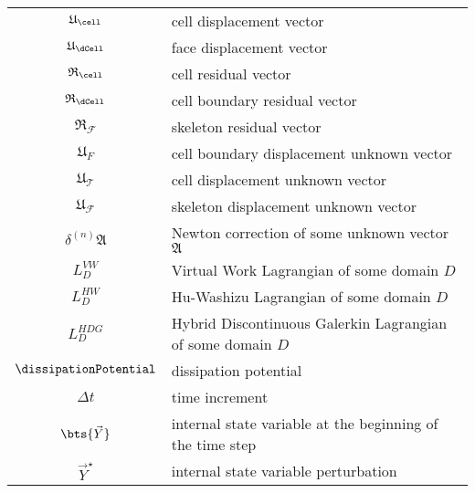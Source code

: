 \begin{longtable}{c l}
    $\mathfrak{U}{}_{\cell}$ & cell displacement vector
    \\
    $\mathfrak{U}{}_{\dCell}$ & face displacement vector
    \\
    $\mathfrak{R}{}_{\cell}$ & cell residual vector
    \\
    $\mathfrak{R}{}_{\dCell}$ & cell boundary residual vector
    \\
    $\mathfrak{R}{}_{\mathcal{F}}$ & skeleton residual vector
    \\
    $\mathfrak{U}{}_{F}$ & cell boundary displacement unknown vector
    \\
    $\mathfrak{U}{}_{\mathcal{T}}$ & cell displacement unknown vector
    \\
    $\mathfrak{U}{}_{\mathcal{F}}$ & skeleton displacement unknown vector
    \\
    $\delta^{(n)} \mathfrak{A}$ & Newton correction of some unknown vector $\mathfrak{A}$
    \\
    $L_{D}^{VW}$ & Virtual Work Lagrangian of some domain $D$
    \\
    $L_{D}^{HW}$ & Hu-Washizu Lagrangian of some domain $D$
    \\
    $L_{D}^{HDG}$ & Hybrid Discontinuous Galerkin Lagrangian of some domain $D$
    \\
    $\dissipationPotential$ & dissipation potential
    \\
    $\Delta t$ & time increment
    \\
    $\bts{\vec{Y}}$ & internal state variable at the beginning of the time step
    \\
    $\vec{Y}^{\star}$ & internal state variable perturbation
    \\
    \hline
\end{longtable}